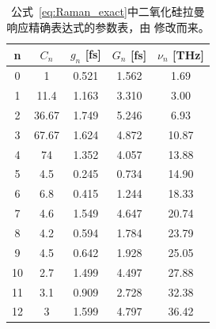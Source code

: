 \begin{table}
\begin{center}
    \begin{tabular}{c|c|c|c|c}
    \label{tab:raman_coeffs}
        n  &$C_n$ & $g_n$ [fs] & $G_n$ [fs] & $\nu_n$ [THz]  \\ \hline
        0  &  1    &0.521       &1.562          &1.69   \\
        1  &  11.4 &1.163       &3.310          &3.00   \\
        2  &  36.67&1.749       &5.246          &6.93   \\
        3  &  67.67&1.624       &4.872          &10.87\\
        4  &  74   &1.352       &4.057          &13.88       \\
        5  &  4.5  &0.245       &0.734          & 14.90   \\
        6  &  6.8  &0.415       &1.244          & 18.33   \\
        7  &  4.6  &1.549       &4.647          & 20.74   \\
        8  &  4.2  &0.594       &1.784          & 23.79  \\
        9  &  4.5  &0.642       &1.928          & 25.05   \\
        10 &  2.7  &1.499       &4.497          & 27.88   \\
        11 &  3.1  &0.909       &2.728          & 32.38   \\
        12 &  3    &1.599       &4.797          &   36.42 
    \end{tabular}
    \caption{公式~\ref{eq:Raman_exact}中二氧化硅拉曼响应精确表达式的参数表，由 \cite{raman_exact}修改而来。  }
    \end{center}
\end{table}

